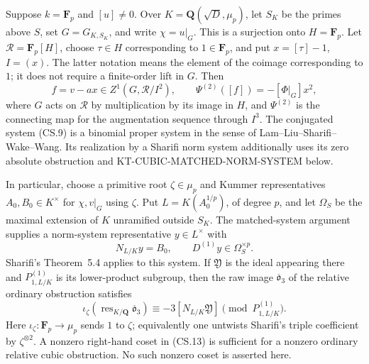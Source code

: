 \begin{corollary}
Suppose \(k=\mathbf F_p\) and \([u]\ne0\).
Over \(K=\mathbf Q(\sqrt D,\mu_p)\), let \(S_K\) be
the primes above \(S\), set \(G=G_{K,S_K}\), and write
\(\chi=u|_G\).  This is a surjection onto \(H=\mathbf F_p\).
Let \(\mathcal R=\mathbf F_p[H]\), choose \(\tau\in H\)
corresponding to \(1\in\mathbf F_p\), and put \(x=[\tau]-1\),
\(I=(x)\).  The latter notation means the element of the
coimage corresponding to \(1\); it does not require a
finite-order lift in \(G\).
Then
\[
 f=v-a x\in Z^1(G,\mathcal R/I^2),\qquad
 \Psi^{(2)}([f])=-[\Phi|_G]x^2,                       \tag{CS.11}
\]
where \(G\) acts on \(\mathcal R\) by multiplication
by its image in \(H\), and \(\Psi^{(2)}\) is the
connecting map for the augmentation sequence through
\(I^3\).  The conjugated system (CS.9) is a binomial proper
system in the sense of Lam--Liu--Sharifi--Wake--Wang.
Its realization by a Sharifi norm system additionally
uses its zero absolute obstruction and
KT-CUBIC-MATCHED-NORM-SYSTEM below.

In particular, choose a primitive root \(\zeta\in\mu_p\)
and Kummer representatives \(A_0,B_0\in K^\times\)
for \(\chi,v|_G\) using \(\zeta\).  Put
\(L=K(A_0^{1/p})\), of degree \(p\), and let
\(\Omega_S\) be the maximal extension of \(K\)
unramified outside \(S_K\).  The matched-system
argument supplies a norm-system representative
\(y\in L^\times\) with
\[
 N_{L/K}y=B_0,\qquad D^{(1)}y\in\Omega_S^{\times p}.
                                                               \tag{CS.12}
\]
Sharifi's Theorem~5.4 applies to this system.  If
\(\mathfrak Y\) is the ideal appearing there and
\(P^{(1)}_{1,L/K}\) is its lower-product subgroup,
then the raw image \(\overline{\mathfrak o}_3\) of
the relative ordinary obstruction satisfies
\[
 \iota_\zeta\!\left(\operatorname{res}_{K/\mathbf Q}
                     \overline{\mathfrak o}_3\right)
     \equiv -3[N_{L/K}\mathfrak Y]
             \pmod{P^{(1)}_{1,L/K}}.                  \tag{CS.13}
\]
Here \(\iota_\zeta:\mathbf F_p\to\mu_p\) sends
\(1\) to \(\zeta\); equivalently one untwists
Sharifi's triple coefficient by \(\zeta^{\otimes2}\).
A nonzero right-hand coset in (CS.13) is sufficient
for a nonzero ordinary relative cubic obstruction.
No such nonzero coset is asserted here.
\end{corollary}

